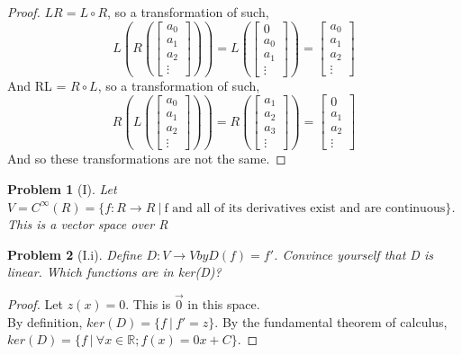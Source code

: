 \documentclass[12pt]{article}   %
\newcommand{\R}{\mathbb{R}} %
\renewcommand{\a}{\alpha}
\newtheorem{problem}{Problem}
\begin{document}
\begin{proof}
$LR = L\circ R$, so a transformation of such, \[L\left(R\left(
\begin{bmatrix}
a_0\\a_1\\a_2\\\vdots
\end{bmatrix}
\right)\right)=L\left(
\begin{bmatrix}
0\\a_0\\a_1\\\vdots
\end{bmatrix}
\right)=
\begin{bmatrix}
a_0\\a_1\\a_2\\\vdots
\end{bmatrix}
\]
And RL = $R\circ L$, so a transformation of such,
\[R\left(L\left(
\begin{bmatrix}
a_0\\a_1\\a_2\\\vdots
\end{bmatrix}
\right)\right)=
R\left(
\begin{bmatrix}
a_1\\a_2\\a_3\\\vdots
\end{bmatrix}
\right)=\begin{bmatrix}
0\\a_1\\a_2\\\vdots
\end{bmatrix}\]
And so these transformations are not the same.
\end{proof}
\begin{problem}[I]
Let $V = C^{\infty}(R) = \{f: R \to R\ \vert\  \text{f and all of its derivatives exist and are continuous}\}$.
This is a vector space over R
\end{problem}
\begin{problem}[I.i]
Define $D: V \to V by D(f) = f'$. Convince yourself that D is linear. Which
functions are in ker(D)?
\end{problem}
\begin{proof}
Let $z(x)=0$. This is $\vec{0}$ in this space.\\
By definition, $ker(D)=\{f\ |\ f'=z\}$. By the fundamental theorem of calculus, $ker(D)=\{f\ |\ \forall x\in\R; f(x)=0x+C\}$.
\end{proof}
\end{document}
